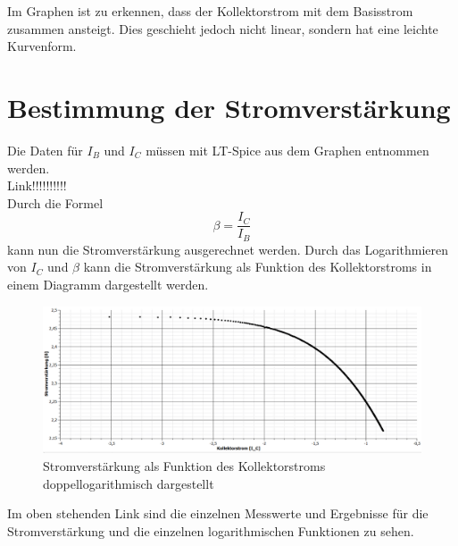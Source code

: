         Im Graphen ist zu erkennen, dass der Kollektorstrom mit dem Basisstrom zusammen ansteigt. Dies geschieht jedoch nicht linear, sondern hat eine leichte Kurvenform.

    \section{Bestimmung der Stromverstärkung}
        Die Daten für \(I_B\) und \(I_C\) müssen mit LT-Spice aus dem Graphen entnommen werden.\\
        Link!!!!!!!!!!\\
        Durch die Formel
        \begin{equation}
            \beta=\frac{I_C}{I_B}
        \end{equation}
        kann nun die Stromverstärkung ausgerechnet werden. Durch das Logarithmieren von \(I_C\) und \(\beta\) kann die Stromverstärkung als Funktion des Kollektorstroms in einem Diagramm dargestellt werden.

        \begin{figure}[!ht]
            \centering
            \includegraphics[width=\linewidth]{Bilder/24graph.PNG}
            \caption{Stromverstärkung als Funktion des Kollektorstroms doppellogarithmisch dargestellt}
            \label{fig:241}
        \end{figure}

        Im oben stehenden Link sind die einzelnen Messwerte und Ergebnisse für die Stromverstärkung und die einzelnen logarithmischen Funktionen zu sehen.

